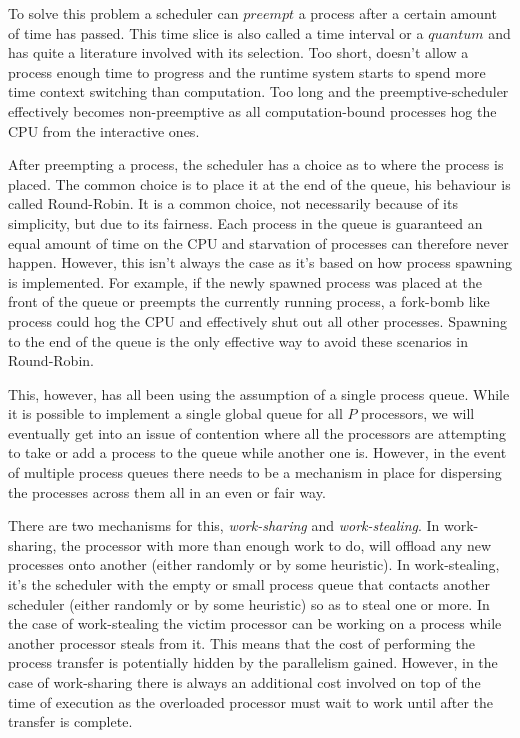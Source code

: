 To solve this problem a scheduler can $preempt$ a process after a certain amount
of time has passed. This time slice is also called a time interval or a $quantum$
and has quite a literature involved with its selection. 
Too short, doesn't allow a process enough time to progress and the runtime system
starts to spend more time context switching than computation. Too long and the
preemptive-scheduler effectively becomes non-preemptive as all computation-bound
processes hog the CPU from the interactive ones.

After preempting a process, the scheduler has a choice as to where the process
is placed. The common choice is to place it at the end of the queue, his 
behaviour is called Round-Robin. It is a common choice, not necessarily because
of its simplicity, but due to its fairness. Each process in the queue is 
guaranteed an equal amount of time on the CPU and starvation of processes can 
therefore never happen. However, this isn't always the case as it's based on how
process spawning is implemented. For example, if the newly spawned process
was placed at the front of the queue or preempts the currently running process,
a fork-bomb like process could hog the CPU and effectively shut out all other 
processes. Spawning to the end of the queue is the only effective way to avoid
these scenarios in Round-Robin.

This, however, has all been using the assumption of a single process queue. While
it is possible to implement a single global queue for all $P$ processors, we will
eventually get into an issue of contention where all the processors are 
attempting to take or add a process to the queue while another one is. However,
in the event of multiple process queues there needs to be a mechanism in place 
for dispersing the processes across them all in an even or fair way.

There are two mechanisms for this, \emph{work-sharing} and 
\emph{work-stealing}. In work-sharing, the processor with more than enough work
to do, will offload any new processes onto another (either randomly or by some
heuristic). In work-stealing, it's the scheduler with the empty or small process 
queue that contacts another scheduler (either 
randomly or by some heuristic) so as to steal one or more. In the case of 
work-stealing the victim processor can be working on a process while another
processor steals from it. This means that the cost of performing the process
transfer is potentially hidden by the parallelism gained. However, in the case 
of work-sharing there is always an additional cost involved on top of the time
of execution as the overloaded processor must wait to work until after the 
transfer is complete.

